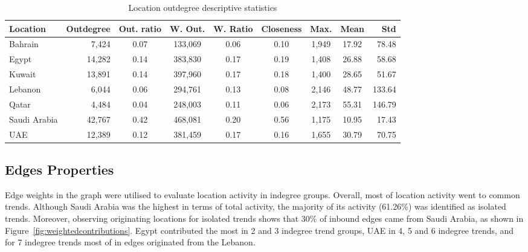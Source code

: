 \documentclass{llncs}
\begin{document}
\begin{table}[!h]
\centering
\caption{Location outdegree descriptive statistics}
\begin{tabular}{@{}lrccccccr@{}}
\toprule
Location & Outdegree & Out. ratio & W. Out. & W. Ratio & Closeness & Max. &  Mean & Std \\ 
\midrule
Bahrain &           7,424 & 0.07 & 133,069 & 0.06 & 0.10 & 1,949 & 17.92 &   78.48\\
Egypt &            14,282 & 0.14 & 383,830 & 0.17 & 0.19 & 1,408 & 26.88 &   58.68\\
Kuwait &          13,891 & 0.14 & 397,960 & 0.17 & 0.18 & 1,400 & 28.65 &   51.67\\
Lebanon &         6,044 & 0.06 & 294,761 & 0.13 & 0.08 & 2,146 & 48.77 & 133.64\\
Qatar &              4,484 & 0.04 & 248,003 & 0.11 & 0.06 & 2,173 & 55.31 & 146.79\\
Saudi Arabia & 42,767 & 0.42 & 468,081 & 0.20 & 0.56 & 1,175 & 10.95 &   17.43\\
UAE &              12,389 & 0.12 & 381,459 & 0.17 & 0.16 & 1,655 & 30.79 &   70.75\\
\bottomrule
\end{tabular}
\label{tbl:locationoutdegree}
\end{table}

\subsection{Edges Properties}

Edge weights in the graph were utilised to evaluate location activity
in indegree groups. %
Overall, most of location
activity went to common trends. Although Saudi Arabia was the highest
in terms of total activity, the majority of its activity (61.26\%) was
identified as isolated trends. Moreover, observing originating
locations for isolated trends shows that 30\% of inbound edges came
from Saudi Arabia, as shown in
Figure~\ref{fig:weightedcontributions}. Egypt contributed the most in
2 and 3 indegree trend groups, UAE in 4, 5 and 6 indegree trends, and
for 7 indegree trends most of in edges originated from the Lebanon.

\end{document}
